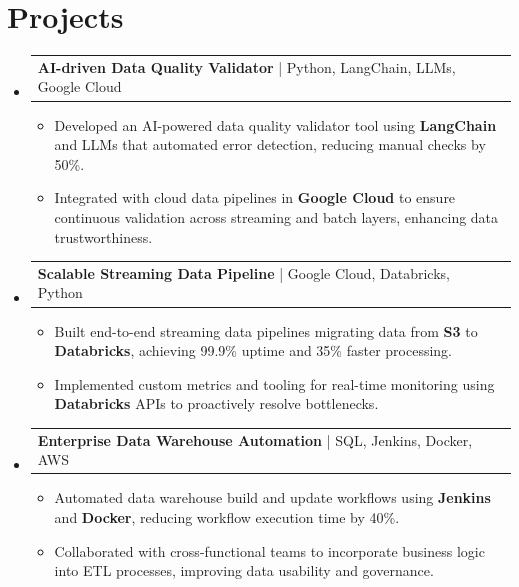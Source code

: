 \documentclass[letterpaper,11pt]{article}
\makeatletter
\newcommand{\resumeItem}[1]{
  \item\footnotesize{
    {#1 \vspace{-2pt}}
  }
}
\newcommand{\resumeProjectHeading}[2]{
    \item
    \begin{tabular*}{1.001\textwidth}{l@{\extracolsep{\fill}}r}
      \small#1 & \textbf{\small #2}\\
    \end{tabular*}\vspace{-7pt}
}
\newcommand{\resumeSubHeadingListStart}{\begin{itemize}[leftmargin=0pt, label={}]}
\newcommand{\resumeSubHeadingListEnd}{\end{itemize}}
\newcommand{\resumeItemListStart}{\begin{itemize}[leftmargin=*]}
\newcommand{\resumeItemListEnd}{\end{itemize}\vspace{-5pt}}
\makeatother
\begin{document}
\section{Projects}
    \vspace{-5pt}
    \resumeSubHeadingListStart
          \resumeProjectHeading
              {\textbf{AI-driven Data Quality Validator} | Python, LangChain, LLMs, Google Cloud}{}
        \resumeItemListStart
            \resumeItem{Developed an AI-powered data quality validator tool using \textbf{LangChain} and LLMs that automated error detection, reducing manual checks by 50\%.}
            \resumeItem{Integrated with cloud data pipelines in \textbf{Google Cloud} to ensure continuous validation across streaming and batch layers, enhancing data trustworthiness.}
        \resumeItemListEnd
        \vspace{-12pt}
    
    \resumeProjectHeading
        {\textbf{Scalable Streaming Data Pipeline} | Google Cloud, Databricks, Python}{}
        \resumeItemListStart
            \resumeItem{Built end-to-end streaming data pipelines migrating data from \textbf{S3} to \textbf{Databricks}, achieving 99.9\% uptime and 35\% faster processing.}
            \resumeItem{Implemented custom metrics and tooling for real-time monitoring using \textbf{Databricks} APIs to proactively resolve bottlenecks.}
        \resumeItemListEnd
          \vspace{-12pt}
      \resumeProjectHeading
          {\textbf{Enterprise Data Warehouse Automation} | SQL, Jenkins, Docker, AWS}{}
          \resumeItemListStart
              \resumeItem{Automated data warehouse build and update workflows using \textbf{Jenkins} and \textbf{Docker}, reducing workflow execution time by 40\%.}
              \resumeItem{Collaborated with cross-functional teams to incorporate business logic into ETL processes, improving data usability and governance.}
          \resumeItemListEnd 
    \resumeSubHeadingListEnd
\end{document}
